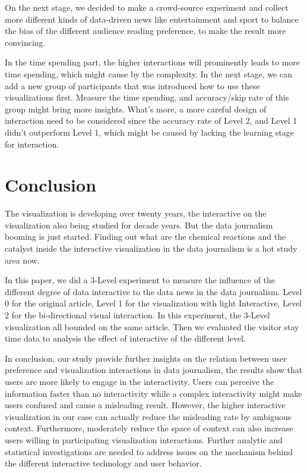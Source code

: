 \documentclass[9pt,journal,compsoc]{IEEEtran}
\begin{document}
On the next stage, we decided to make a crowd-source experiment and collect more different kinds of data-driven news like entertainment and sport to balance the bias of the different audience reading preference, to make the result more convincing.

In the time spending part, the higher interactions will prominently leads to  more time spending, which might cause by the complexity. In the next stage, we can add a new group of participants that was introduced how to use these visualizations first. Measure the time spending, and accuracy/skip rate of this group might bring more insights. What's more, a more careful design of interaction need to be considered since the accuracy rate of Level 2, and Level 1 didn't outperform Level 1, which might be caused by lacking the learning stage for interaction.

\section{Conclusion}
\large
The visualization is developing over twenty years, the interactive on the visualization also being studied for decade years. But the data journalism booming is just started. Finding out what are the chemical reactions and the catalyst inside the interactive visualization in the data journalism is a hot study area now.

In this paper, we did a 3-Level experiment to measure the influence of the different degree of data interactive to the data news in the data journalism.  Level 0 for the original article, Level 1 for the visualization with light Interactive, Level 2 for the bi-directional visual interaction. In this experiment, the 3-Level visualization all bounded on the same article. Then we evaluated the visitor stay time data to analysis the effect of interactive of the different level.

In conclusion, our study provide further insights on the relation between user preference and visualization interactions in data journalism, the results show that users are more likely to engage in the interactivity. Users can perceive the information faster than no interactivity while a complex interactivity might make users confused and cause a misleading result. However, the higher interactive visualization in our case can actually reduce the misleading rate by ambiguous context. Furthermore, moderately reduce the space of context can also increase users willing in participating visualization interactions.  Further analytic and statistical investigations are needed to address issues on the mechanism behind the different interactive technology and user behavior.
\end{document}
